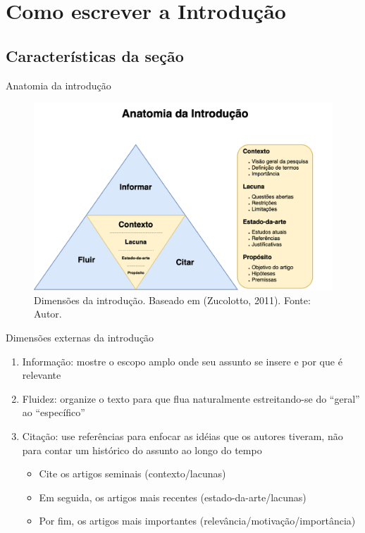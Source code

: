 
\section{Como escrever a Introdução}

\subsection{Características da seção}

\begin{frame}{Anatomia da introdução}
\begin{figure}
\centering
\includegraphics[scale=0.2]{figs/06/introducao-paper}
\caption{Dimensões da introdução. Baseado em (Zucolotto, 2011). Fonte: Autor.}
\end{figure}
\end{frame}

\begin{frame}{Dimensões externas da introdução}
\begin{enumerate}
\item Informação: mostre o escopo amplo onde seu assunto se insere e por que é relevante
\item Fluidez: organize o texto para que flua naturalmente estreitando-se do ``geral'' ao ``específico''
\item Citação: use referências para enfocar as idéias que os autores tiveram, não para contar um histórico do assunto ao longo do tempo
\begin{itemize}
\item Cite os artigos seminais (contexto/lacunas) 
\item Em seguida, os artigos mais recentes (estado-da-arte/lacunas)
\item Por fim, os artigos mais importantes (relevância/motivação/importância)
\end{itemize}
\end{enumerate}
\end{frame}

